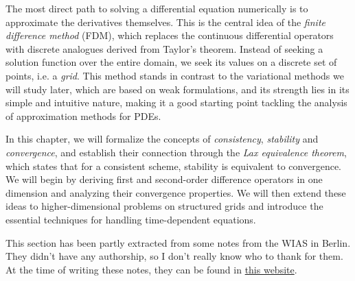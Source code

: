 The most direct path to solving a differential equation numerically is to approximate the derivatives themselves. This is the central idea of the \emph{finite difference method} (FDM), which replaces the continuous differential operators with discrete analogues derived from Taylor's theorem. Instead of seeking a solution function over the entire domain, we seek its values on a discrete set of points, i.e. a \emph{grid}. This method stands in contrast to the variational methods we will study later, which are based on weak formulations, and its strength lies in its simple and intuitive nature, making it a good starting point tackling the analysis of approximation methods for PDEs. 

In this chapter, we will formalize the concepts of \emph{consistency}, \emph{stability} and \emph{convergence}, and establish their connection through the \emph{Lax equivalence theorem}, which states that for a consistent scheme, stability is equivalent to convergence. We will begin by deriving first and second-order difference operators in one dimension and analyzing their convergence properties. We will then extend these ideas to higher-dimensional problems on structured grids and introduce the essential techniques for handling time-dependent equations.

This section has been partly extracted from some notes from the WIAS in Berlin. They didn't have any authorship, so I don't really know who to thank for them. At the time of writing these notes, they can be found in \href{https://www.wias-berlin.de/people/john/LEHRE/NUMERIK\_IV\_21\_22/num\_konv\_dom\_prob\_3.pdf}{this website}.

